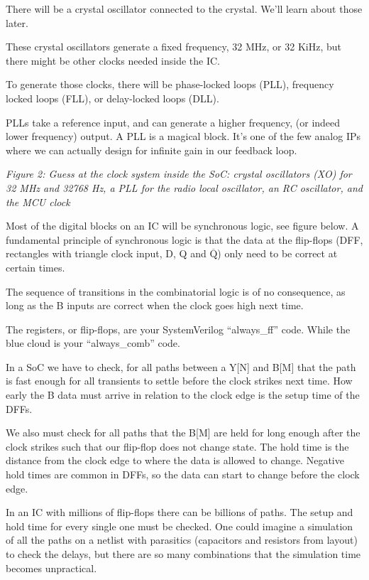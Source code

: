There will be a crystal oscillator connected to the crystal. We'll learn
about those later.

These crystal oscillators generate a fixed frequency, 32 MHz, or 32
KiHz, but there might be other clocks needed inside the IC.

To generate those clocks, there will be phase-locked loops (PLL),
frequency locked loops (FLL), or delay-locked loops (DLL).

PLLs take a reference input, and can generate a higher frequency, (or
indeed lower frequency) output. A PLL is a magical block. It's one of
the few analog IPs where we can actually design for infinite gain in our
feedback loop.


{
\centering
{}
}

\emph{Figure 2: Guess at the clock system inside the SoC: crystal
oscillators (XO) for 32 MHz and 32768 Hz, a PLL for the radio local
oscillator, an RC oscillator, and the MCU clock}

Most of the digital blocks on an IC will be synchronous logic, see
figure below. A fundamental principle of synchronous logic is that the
data at the flip-flops (DFF, rectangles with triangle clock input, D, Q
and \(\overline{\text{Q}}\)) only need to be correct at certain times.

The sequence of transitions in the combinatorial logic is of no
consequence, as long as the B inputs are correct when the clock goes
high next time.

The registers, or flip-flops, are your SystemVerilog ``always\_ff''
code. While the blue cloud is your ``always\_comb'' code.

In a SoC we have to check, for all paths between a Y{[}N{]} and B{[}M{]}
that the path is fast enough for all transients to settle before the
clock strikes next time. How early the B data must arrive in relation to
the clock edge is the setup time of the DFFs.

We also must check for all paths that the B{[}M{]} are held for long
enough after the clock strikes such that our flip-flop does not change
state. The hold time is the distance from the clock edge to where the
data is allowed to change. Negative hold times are common in DFFs, so
the data can start to change before the clock edge.

In an IC with millions of flip-flops there can be billions of paths. The
setup and hold time for every single one must be checked. One could
imagine a simulation of all the paths on a netlist with parasitics
(capacitors and resistors from layout) to check the delays, but there
are so many combinations that the simulation time becomes unpractical.

